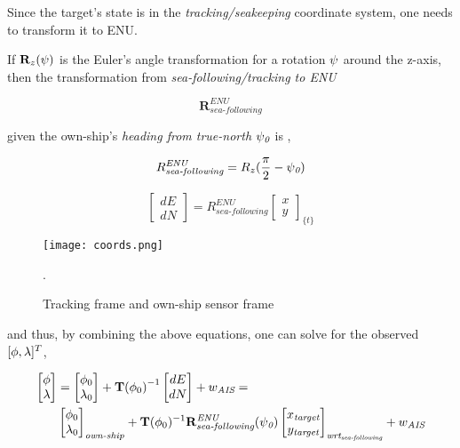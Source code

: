 Since the target's state is in the \emph{tracking/seakeeping} coordinate system, one needs to transform it to ENU.

If $\mathbf{R}_z({\psi})$ is the Euler's angle transformation for a rotation ${\psi}$ around the z-axis, then the transformation from \emph{sea-following/tracking to ENU}

$$\mathbf{R}^{\textit{ENU}}_{\textit{sea-following}} $$

given the own-ship's \emph{heading from true-north} ${\psi}_{\textit{0}}$
is ,


\begin{equation}
R_{\textit{sea-following}}^{\textit{ENU}} = R_{z}(\frac{\pi}{2}-{\psi}_{\textit{0}})
\end{equation}


\begin{equation}
\begin{bmatrix}
dE\\ dN
\end{bmatrix}=
R_{\textit{sea-following}}^{\textit{ENU}}
\begin{bmatrix}
x\\ y
\end{bmatrix}_{\textit{\{t\}}}
\end{equation}


\begin{figure}[H]
	\centering
	\texttt{[image: coords.png]}
	\caption{Tracking frame and own-ship sensor frame}.
	\label{fig:track_vs_own_ship}
\end{figure}



and thus, by combining the above equations, one can solve for the observed $[{\phi}, {\lambda}]^{T}$,

\begin{equation}
\begin{aligned}
\begin{bmatrix}
{\phi}\\ {\lambda}
\end{bmatrix}&=
\begin{bmatrix}
{\phi}_{0}\\ {\lambda}_{0}
\end{bmatrix} + {\mathbf{T}({\phi}_{0})}^{-1}\begin{bmatrix}
dE\\ dN
\end{bmatrix} + {w}_{\textit{AIS}}=  \\
&\begin{bmatrix}
{\phi}_{0}\\ {\lambda}_{0}
\end{bmatrix}_{\textit{own-ship}} + \mathbf{T}({\phi}_{0})^{-1}
\mathbf{R}^{\textit{ENU}}_{\textit{sea-following}}({\psi}_{\textit{0}})
\begin{bmatrix}
x_{\textit{target}}\\ y_{\textit{target}}
\end{bmatrix}_{\textit{wrt}_{{\textit{sea-following}}}}+{w}_{\textit{AIS}}
\end{aligned}
\end{equation}


